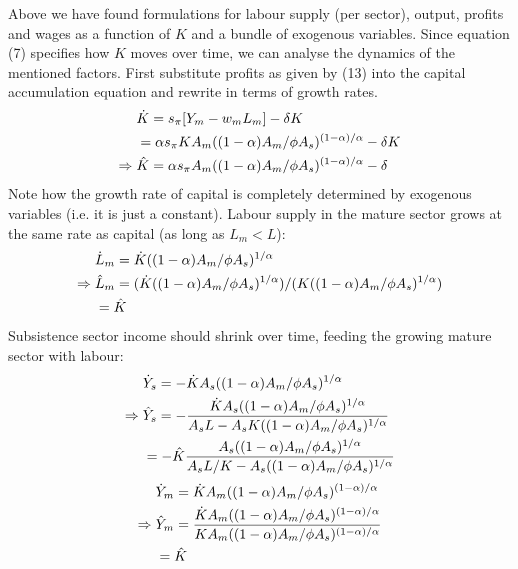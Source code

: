 \documentclass[a4paper]{article}
\begin{document}
Above we have found formulations for labour supply (per sector), output, profits and wages as a function of $K$ and a bundle of exogenous variables. Since equation (7) specifies how $K$ moves over time, we can analyse the dynamics of the mentioned factors. First substitute profits as given by (13) into the capital accumulation equation and rewrite in terms of growth rates.
\begin{subequations}
\begin{align}
 &\dot{K} 	=s_{\pi}[Y_m-w_mL_m]-{\delta}K \nonumber\\
 &{}		={\alpha}s_{\pi}KA_m((1-{\alpha})A_m/{\phi}A_s)^{(1-\alpha)/\alpha}-{\delta}K\\ 
 \Rightarrow \hspace{0.1cm} 
 &\hat{K}	={\alpha}s_{\pi}A_m((1-{\alpha})A_m/{\phi}A_s)^{(1-\alpha)/\alpha}-{\delta}
\end{align}
\end{subequations}
Note how the growth rate of capital is completely determined by exogenous variables (i.e. it is just a constant). Labour supply in the mature sector grows at the same rate as capital (as long as $L_m<L$):
\begin{subequations}
\begin{align}
 &\dot{L}_m =\dot{K}((1-{\alpha})A_m/{\phi}A_s)^{1/{\alpha}}\\
 \Rightarrow \hspace{0.1cm} 
 &\hat{L}_m	=(\dot{K}((1-{\alpha})A_m/{\phi}A_s)^{1/{\alpha}})/(K((1-{\alpha})A_m/{\phi}A_s)^{1/{\alpha}})\nonumber\\
 &{}		=\hat{K}
\end{align}
\end{subequations}
\newpage
\noindent Subsistence sector income should shrink over time, feeding the growing mature sector with labour:
\begin{subequations}
\begin{align}
 &\dot{Y}_s =-\dot{K}A_s((1-{\alpha})A_m/{\phi}A_s)^{1/{\alpha}}\\
 \Rightarrow \hspace{0.1cm} 
 &\hat{Y}_s	=-\frac{\dot{K}A_s((1-{\alpha})A_m/{\phi}A_s)^{1/{\alpha}}}{A_sL-A_sK((1-{\alpha})A_m/{\phi}A_s)^{1/{\alpha}}}\nonumber\\
 &{}		=-\hat{K}\frac{A_s((1-{\alpha})A_m/{\phi}A_s)^{1/{\alpha}}}{A_sL/K-A_s((1-{\alpha})A_m/{\phi}A_s)^{1/{\alpha}}}
\end{align}
\end{subequations}
\begin{subequations}
\begin{align}
 &\dot{Y}_m =\dot{K}A_m((1-{\alpha})A_m/{\phi}A_s)^{(1-\alpha)/{\alpha}}\\
 \Rightarrow \hspace{0.1cm} 
 &\hat{Y}_m	=\frac{\dot{K}A_m((1-{\alpha})A_m/{\phi}A_s)^{(1-\alpha)/{\alpha}}}{KA_m((1-{\alpha})A_m/{\phi}A_s)^{(1-\alpha)/{\alpha}}}\nonumber\\
 &{}		=\hat{K}
\end{align}
\end{subequations}
\end{document}

